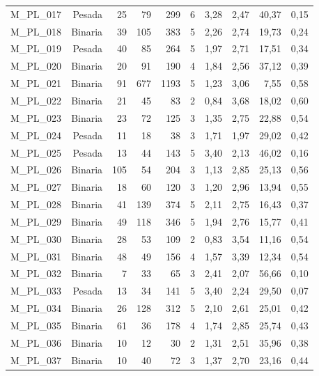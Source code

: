 \begin{table}[ht!]
\begin{tabular}{lrrrrrrrrr}
    M\_PL\_017 & Pesada & 25   & 79   & 299  & 6    & 3,28 & 2,47 & 40,37 & 0,15 \\
    M\_PL\_018 & Binaria & 39   & 105  & 383  & 5    & 2,26 & 2,74 & 19,73 & 0,24 \\
    M\_PL\_019 & Pesada & 40   & 85   & 264  & 5    & 1,97 & 2,71 & 17,51 & 0,34 \\
    M\_PL\_020 & Binaria & 20   & 91   & 190  & 4    & 1,84 & 2,56 & 37,12 & 0,39 \\
    M\_PL\_021 & Binaria & 91   & 677  & 1193 & 5    & 1,23 & 3,06 & 7,55 & 0,58 \\
    M\_PL\_022 & Binaria & 21   & 45   & 83   & 2    & 0,84 & 3,68 & 18,02 & 0,60 \\
    M\_PL\_023 & Binaria & 23   & 72   & 125  & 3    & 1,35 & 2,75 & 22,88 & 0,54 \\
    M\_PL\_024 & Pesada & 11   & 18   & 38   & 3    & 1,71 & 1,97 & 29,02 & 0,42 \\
    M\_PL\_025 & Pesada & 13   & 44   & 143  & 5    & 3,40 & 2,13 & 46,02 & 0,16 \\
    M\_PL\_026 & Binaria & 105  & 54   & 204  & 3    & 1,13 & 2,85 & 25,13 & 0,56 \\
    M\_PL\_027 & Binaria & 18   & 60   & 120  & 3    & 1,20 & 2,96 & 13,94 & 0,55 \\
    M\_PL\_028 & Binaria & 41   & 139  & 374  & 5    & 2,11 & 2,75 & 16,43 & 0,37 \\
    M\_PL\_029 & Binaria & 49   & 118  & 346  & 5    & 1,94 & 2,76 & 15,77 & 0,41 \\
    M\_PL\_030 & Binaria & 28   & 53   & 109  & 2    & 0,83 & 3,54 & 11,16 & 0,54 \\
    M\_PL\_031 & Binaria & 48   & 49   & 156  & 4    & 1,57 & 3,39 & 12,34 & 0,54 \\
    M\_PL\_032 & Binaria & 7    & 33   & 65   & 3    & 2,41 & 2,07 & 56,66 & 0,10 \\
    M\_PL\_033 & Pesada & 13   & 34   & 141  & 5    & 3,40 & 2,24 & 29,50 & 0,07 \\
    M\_PL\_034 & Binaria & 26   & 128  & 312  & 5    & 2,10 & 2,61 & 25,01 & 0,42 \\
    M\_PL\_035 & Binaria & 61   & 36   & 178  & 4    & 1,74 & 2,85 & 25,74 & 0,43 \\
    M\_PL\_036 & Binaria & 10   & 12   & 30   & 2    & 1,31 & 2,51 & 35,96 & 0,38 \\
    M\_PL\_037 & Binaria & 10   & 40   & 72   & 3    & 1,37 & 2,70 & 23,16 & 0,44 \\

\end{tabular}
\end{table}

